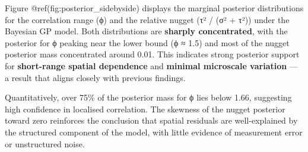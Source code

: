 \documentclass[
  11pt,
]{article}
\newenvironment{Shaded}{\begin{snugshade}}{\end{snugshade}}
\newcommand{\AttributeTok}[1]{\textcolor[rgb]{0.40,0.45,0.13}{#1}}
\newcommand{\CommentTok}[1]{\textcolor[rgb]{0.37,0.37,0.37}{#1}}
\newcommand{\DecValTok}[1]{\textcolor[rgb]{0.68,0.00,0.00}{#1}}
\newcommand{\FloatTok}[1]{\textcolor[rgb]{0.68,0.00,0.00}{#1}}
\newcommand{\FunctionTok}[1]{\textcolor[rgb]{0.28,0.35,0.67}{#1}}
\newcommand{\NormalTok}[1]{\textcolor[rgb]{0.00,0.23,0.31}{#1}}
\newcommand{\OtherTok}[1]{\textcolor[rgb]{0.00,0.23,0.31}{#1}}
\newcommand{\SpecialCharTok}[1]{\textcolor[rgb]{0.37,0.37,0.37}{#1}}
\newcommand{\StringTok}[1]{\textcolor[rgb]{0.13,0.47,0.30}{#1}}
\begin{document}
Figure @ref(fig:posterior\_sidebyside) displays the marginal posterior
distributions for the correlation range (ϕ) and the relative nugget (τ²
/ (σ² + τ²)) under the Bayesian GP model. Both distributions are
\textbf{sharply concentrated}, with the posterior for ϕ peaking near the
lower bound (ϕ ≈ 1.5) and most of the nugget posterior mass concentrated
around 0.01. This indicates strong posterior support for
\textbf{short-range spatial dependence} and \textbf{minimal microscale
variation} --- a result that aligns closely with previous findings.

Quantitatively, over 75\% of the posterior mass for ϕ lies below 1.66,
suggesting high confidence in localised correlation. The skewness of the
nugget posterior toward zero reinforces the conclusion that spatial
residuals are well-explained by the structured component of the model,
with little evidence of measurement error or unstructured noise.

\begin{Shaded}
\end{Shaded}
\end{document}
